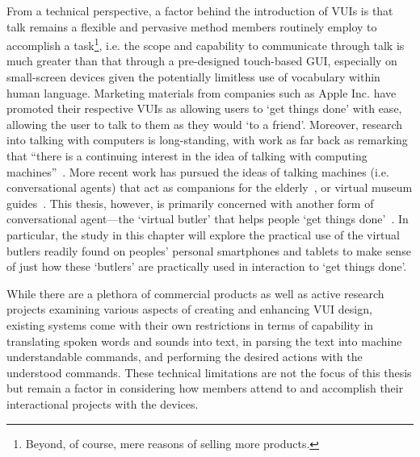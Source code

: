 \begin{revisedsubmission}
From a technical perspective, a factor behind the introduction of \acp{VUI} is that talk remains a flexible and pervasive method members routinely employ to accomplish a task\footnote{Beyond, of course, mere reasons of selling more products.}, i.e. the scope and capability to communicate through talk is much greater than that through a pre-designed touch-based \ac{GUI}, especially on small-screen devices given the potentially limitless use of vocabulary within human language.
Marketing materials from companies such as Apple Inc. have promoted their respective \acp{VUI} as allowing users to `get things done' with ease, allowing the user to talk to them as they would `to a friend'.
Moreover, research into talking with computers is long-stand\-ing, with work as far back as \citet{Licklider1960} remarking that ``there is a continuing interest in the idea of talking with computing machines''~\citep[p. 10]{Licklider1960}.
More recent work has pursued the ideas of talking machines (i.e. conversational agents) that act as companions for the elderly~\citep{Vardoulakis2012}, or virtual museum guides~\citep{Kopp2005}.
This thesis, however, is primarily concerned with another form of conversational agent---the `virtual butler' that helps people `get things done'~\citep{Payr2013}.
In particular, the study in this chapter will explore the practical use of the virtual butlers readily found on peoples' personal smartphones and tablets to make sense of just how these `butlers' are practically used in interaction to `get things done'.

While there are a plethora of commercial products as well as active research projects examining various aspects of creating and enhancing \ac{VUI} design, existing systems come with their own restrictions in terms of capability in translating spoken words and sounds into text, in parsing the text into machine understandable commands, and performing the desired actions with the understood commands.
These technical limitations are not the focus of this thesis but remain a factor in considering how members attend to and accomplish their interactional projects with the devices.
\end{revisedsubmission}

